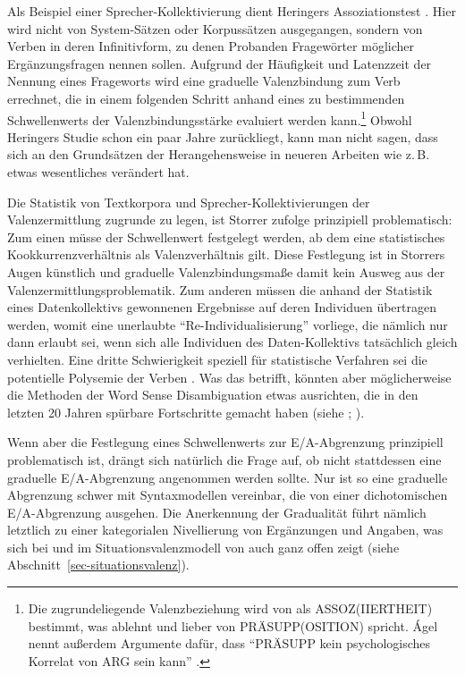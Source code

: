 Als Beispiel einer Sprecher-Kollektivierung dient \citet[93ff,232ff]{Storrer:92} Heringers Assoziationstest \citep{Heringer:85}. Hier wird nicht von System-Sätzen oder Korpussätzen ausgegangen, sondern von Verben in deren Infinitivform, zu denen Probanden Fragewörter möglicher Ergänzungsfragen nennen sollen. Aufgrund der Häufigkeit und Latenzzeit der Nennung eines Frageworts wird eine graduelle Valenzbindung zum Verb errechnet, die in einem folgenden Schritt anhand eines zu bestimmenden Schwellenwerts der Valenzbindungsstärke evaluiert werden kann.\footnote{Die zugrundeliegende Valenzbeziehung wird von \citet[29]{Jacobs:94} als ASSOZ(IIERTHEIT) bestimmt, was \citet[209]{Agel:00} ablehnt und lieber von PRÄSUPP(OSITION) spricht. \'Agel nennt au\ss erdem Argumente dafür, dass "`PRÄSUPP kein psychologisches Korrelat von ARG sein kann"' \citep[210]{Agel:00}.}  Obwohl Heringers Studie schon ein paar Jahre zurückliegt, kann man nicht sagen, dass sich an den Grundsätzen der Herangehensweise in neueren Arbeiten wie z.\,B.\ \cite{SchulteImWalde:08} etwas wesentliches verändert hat.

Die Statistik von Textkorpora und Sprecher-Kollektivierungen der Valenzermittlung zugrunde zu legen, ist Storrer zufolge prinzipiell problematisch: Zum einen müsse der Schwellenwert festgelegt werden, ab dem eine statistisches Kookkurrenzverhältnis als Valenzverhältnis gilt. Diese Festlegung ist in Storrers Augen künstlich und graduelle Valenzbindungsma\ss e damit kein Ausweg aus der Valenzermittlungsproblematik. Zum anderen müssen die anhand der Statistik eines Datenkollektivs gewonnenen Ergebnisse auf deren Individuen übertragen werden, womit eine unerlaubte "`Re-Individualisierung"' \citep[233]{Storrer:92} vorliege, die nämlich nur dann erlaubt sei, wenn sich alle Individuen des Daten-Kollektivs tatsächlich gleich verhielten. Eine dritte Schwierigkeit speziell für statistische Verfahren sei die potentielle Polysemie der Verben \citep[Fußnote 174]{Storrer:92}. Was das betrifft, könnten aber möglicherweise die Methoden der Word Sense Disambiguation  etwas ausrichten, die in den letzten 20 Jahren spürbare Fortschritte gemacht haben (siehe \citealt{McCarthy:09}; \citealt[Kapitel 20]{Jurafsky:Martin:09}).

Wenn aber die Festlegung eines Schwellenwerts zur E/A-Abgrenzung prinzipiell problematisch ist, drängt sich natürlich die Frage auf, ob nicht stattdessen eine graduelle E/A-Abgrenzung angenommen werden sollte. Nur ist so eine graduelle Abgrenzung schwer mit Syntaxmodellen vereinbar, die von einer dichotomischen E/A-Abgrenzung ausgehen. Die Anerkennung der Gradualität führt nämlich letztlich zu einer kategorialen Nivellierung von Ergänzungen und Angaben, was sich bei \cite{Heringer:84} und im Situationsvalenzmodell von \cite{Storrer:92} auch ganz offen zeigt (siehe Abschnitt~\ref{sec-situationsvalenz}).	        


